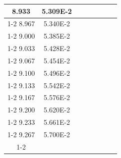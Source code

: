\documentclass[article,12pt]{elsarticle}
\begin{document}
\begin{longtable}[c]{|c|c|cccccc}
8.933    & 5.309E-2  &                       &                              &                            &                       &                              &                               \\ \cline{1-2}
8.967    & 5.340E-2  &                       &                              &                            &                       &                              &                               \\ \cline{1-2}
9.000    & 5.385E-2  &                       &                              &                            &                       &                              &                               \\ \cline{1-2}
9.033    & 5.428E-2  &                       &                              &                            &                       &                              &                               \\ \cline{1-2}
9.067    & 5.454E-2  &                       &                              &                            &                       &                              &                               \\ \cline{1-2}
9.100    & 5.496E-2  &                       &                              &                            &                       &                              &                               \\ \cline{1-2}
9.133    & 5.542E-2  &                       &                              &                            &                       &                              &                               \\ \cline{1-2}
9.167    & 5.576E-2  &                       &                              &                            &                       &                              &                               \\ \cline{1-2}
9.200    & 5.620E-2  &                       &                              &                            &                       &                              &                               \\ \cline{1-2}
9.233    & 5.661E-2  &                       &                              &                            &                       &                              &                               \\ \cline{1-2}
9.267    & 5.700E-2  &                       &                              &                            &                       &                              &                               \\ \cline{1-2}

\end{longtable}
\end{document}
